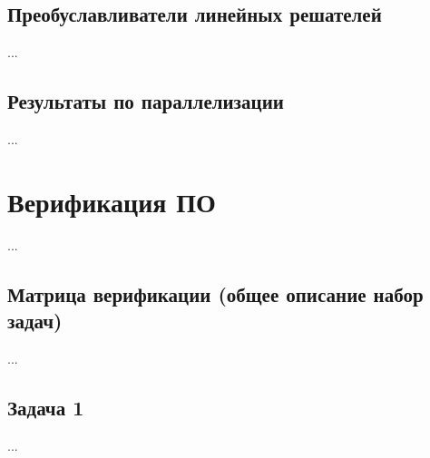 \documentclass[a4paper,10pt]{report}
\begin{document}
\subsection{Преобуславливатели линейных решателей}
...

\subsection{Результаты по параллелизации}
...


\section{Верификация ПО}
...

\subsection{Матрица верификации (общее описание набор задач)}
...

\subsection{Задача 1}
...


%
%
\end{document}
